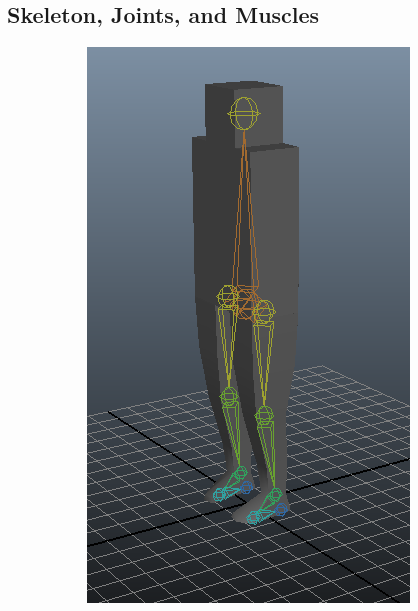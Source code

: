 
\subsection{Skeleton, Joints, and Muscles}
\label{subsection:skel_joints}

\begin{figure}[htp]
	\centering
	\begin{subfigure}[b]{0.41\textwidth}
		\includegraphics[width=\textwidth]{images/simpleSkeleton2Screen1Cropped.png}

\end{subfigure}
\end{figure}
